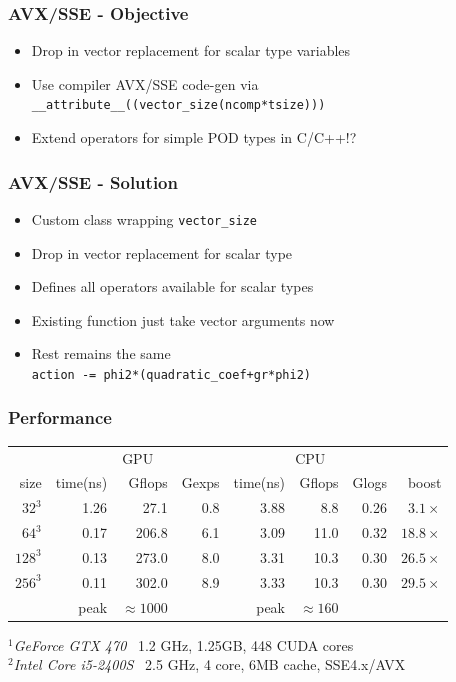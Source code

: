 \documentclass{beamer}
\begin{document}

\begin{frame}
  \frametitle{AVX/SSE - Objective}
  \begin{itemize}
    \item Drop in vector replacement for scalar type variables
    \item Use compiler AVX/SSE code-gen via
    \texttt{\_\_attribute\_\_((vector\_size(ncomp*tsize)))}
    \item Extend operators for simple POD types in C/C++!?
  \end{itemize}
\end{frame}

\begin{frame}
  \frametitle{AVX/SSE - Solution}
  \begin{itemize}
    \item Custom class wrapping \texttt{vector\_size}
    \item Drop in vector replacement for scalar type
    \item Defines all operators available for scalar types
    \item Existing function just take vector arguments now
    \item Rest remains the same \\
    \texttt{action -= phi2*(quadratic\_coef+gr*phi2)}
  \end{itemize}
\end{frame}


\begin{frame} 

\frametitle{Performance}

\begin{center}
\def\arraystretch{1.1}%
\setlength{\tabcolsep}{0.25em}
\begin{tabular}{ r| r r r | r r r| r }
           & \multicolumn{3}{c|}{GPU\footnotemark} &
             \multicolumn{3}{c|}{CPU\footnotemark}  &  \\
    size   & time(ns) & Gflops & Gexps &time(ns) & Gflops & Glogs & boost \\
  \hline
   $32^3$  & 1.26     &  27.1 & 0.8 & 3.88    &  8.8 & 0.26 &  $3.1 \times$ \\
   $64^3$  & 0.17     & 206.8 & 6.1 & 3.09    & 11.0 & 0.32 & $18.8 \times$ \\
  $128^3$  & 0.13     & 273.0 & 8.0 & 3.31    & 10.3 & 0.30 & $26.5 \times$ \\
  $256^3$  & 0.11     & 302.0 & 8.9 & 3.33    & 10.3 & 0.30 & $29.5 \times$ \\
  \hline
                      & \footnotesize peak & $\approx 1000$ &
                      & \footnotesize peak & $\approx 160$ &
\end{tabular}
\end{center}
\vfill
\small
$^1$\emph{GeForce GTX 470} \, 1.2 GHz, 1.25GB, 448 CUDA cores \\
$^2$\emph{Intel Core i5-2400S} \, 2.5 GHz, 4 core, 6MB cache, SSE4.x/AVX
\end{frame}
\end{document}
